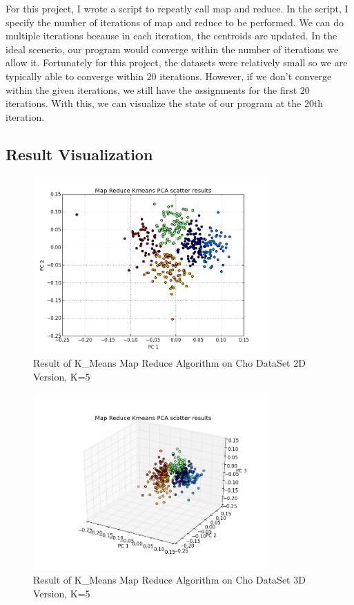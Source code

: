 \documentclass[paper=letter, fontsize=11pt]{article}
\numberwithin{equation}{section}		%
\numberwithin{figure}{section}			%
\numberwithin{table}{section}				%
\begin{document}
For this project, I wrote a script to repeatly call map and reduce. In the script, I specify the number of iterations of map and reduce to be performed. We can do multiple iterations because in each iteration, the centroids are updated. In the ideal scenerio, our program would converge within the number of iterations we allow it. Fortunately for this project, the datasets were relatively small so we are typically able to converge within 20 iterations. However, if we don't converge within the given iterations, we still have the assignments for the first 20 iterations. With this, we can visualize the state of our program at the 20th iteration.
\subsection{Result Visualization}
\begin{figure}[H]
	\centering
	\includegraphics[width=0.8\textwidth]{MP_cho_2D}
	\caption{Result of K\_Means Map Reduce Algorithm on Cho DataSet 2D Version, K=5}
\end{figure}
\begin{figure}[H]
	\centering
	\includegraphics[width=0.8\textwidth]{MP_cho_3D}
	\caption{Result of K\_Means Map Reduce Algorithm on Cho DataSet 3D Version, K=5}
\end{figure}
\end{document}
